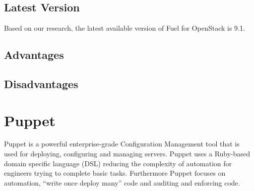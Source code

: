 \documentclass[a4paper, 12pt]{article}
\begin{document}
\subsection{Latest Version}
Based on our research, the latest available version of Fuel for OpenStack is 9.1.

\subsection{Advantages}

\subsection{Disadvantages}

\newpage
\section{Puppet}
Puppet is a powerful enterprise-grade Configuration Management tool that is used for deploying, configuring and managing servers. Puppet uses a Ruby-based domain specific language (DSL) reducing the complexity of automation for engineers trying to complete basic tasks. Furthermore Puppet focuses on automation, “write once deploy many” code and auditing and enforcing code.
\end{document}
